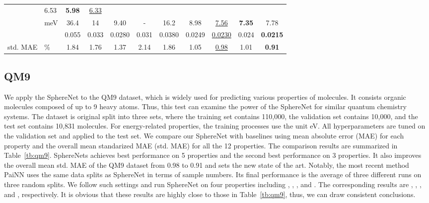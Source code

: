\documentclass{article}
\begin{document}
\begin{table*}[t]
{\begin{tabular}{llccccccccc}
&  6.53 & \textbf{5.98}& \underline{6.33}\\
                          &                          meV &   36.4 &              14 &    9.40 &                 - &  16.2  & 8.98 
&  \underline{7.56} & \textbf{7.35}&  7.78\\
 \vspace{1pt}    &   &  0.055 &           0.033 &  0.0280 &    0.031 & 0.0380 & 0.0249 
&  \underline{0.0230} & 0.024&  \textbf{0.0215}\\
\hline 
std. MAE &                                    \% &   1.84 &            1.76 &    1.37 &     2.14 & 1.86   & 1.05 &  \underline{0.98} & 1.01& \textbf{0.91}\\
\bottomrule
\end{tabular}}
\end{table*}









\subsection{QM9}
We apply the SphereNet to the QM9 dataset,
which is widely used
for predicting various properties of molecules. 
It consists organic molecules composed of up to 9 heavy atoms. Thus, this test can examine
the power of the SphereNet for similar quantum chemistry systems.
The dataset is original split into three sets, where the training set
contains 110,000, the validation set contains 10,000, and the test set contains 10,831 molecules.
For energy-related properties, the training processes
use the unit eV.
All hyperparameters are tuned on the validation set
and applied to the test set.
We compare our SphereNet with baselines 
using mean absolute error (MAE) for each property and 
the overall mean standarized MAE (std. MAE) for all the 12 properties.
The comparison results are 
summarized in Table~\ref{tb:qm9}.
SphereNets achieves best
performance on 5 properties and the second best performance
on 3 properties.
It also improves the overall mean std. MAE
of the QM9 dataset from 0.98 to 0.91 and sets the new state of the art.
\textcolor{COLOR}{Notably, the most recent method PaiNN uses the same data splits as SphereNet in terms of sample numbers.
Its final performance is the average of three different runs
on three random splits.
We follow such settings and run SphereNet on four properties including
, , , and .
The corresponding results are , , , and , respectively.
It is obvious that these results are highly close to those in Table~\ref{tb:qm9}, thus, we can draw consistent conclusions.}
\end{document}
